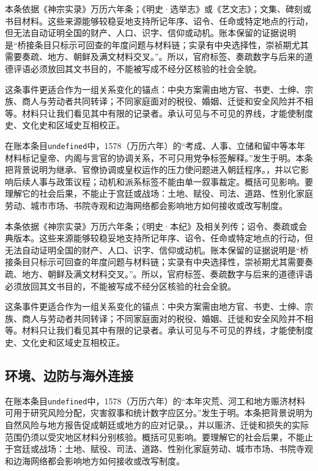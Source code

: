 本条依据《神宗实录》万历六年条；《明史·选举志》或《艺文志》；文集、碑刻或书目材料。这些来源能够较稳妥地支持所记年序、诏令、任命或特定地点的行动，但无法自动证明全国的财产、人口、识字、信仰或动机。账本保留的证据说明是“桥接条目只标示可回查的年度问题与材料链；实录有中央选择性，崇祯期尤其需要奏疏、地方、朝鲜及满文材料交叉。”。所以，官府标签、奏疏数字与后来的道德评语必须放回其文书目的，不能被写成不经分区核验的社会全貌。

这条事件更适合作为一组关系变化的锚点：中央方案需由地方官、书吏、士绅、宗族、商人与劳动者共同转译；不同家庭面对的税役、婚姻、迁徙和安全风险并不相等。材料只让我们看见其中有限的记录者。承认可见与不可见的界线，才能使制度史、文化史和区域史互相校正。

在账本条目\texttt{undefined}中，1578（万历六年）的“考成、人事、立储和留中等本年材料标记皇帝、内阁与言官的协调关系，不可只用党争标签解释。”发生于明。本条把背景说明为继承、官僚协调或皇权运作的压力使问题进入朝廷程序。，并以它影响后续人事与政策议程；动机和派系标签不能由单一叙事裁定。概括可见影响。要理解它的社会后果，不能止于宫廷或战场：土地、赋役、司法、道路、性别化家庭劳动、城市市场、书院寺观和边海网络都会影响地方如何接收或改写制度。

本条依据《神宗实录》万历六年条；《明史·本纪》及相关列传；诏令、奏疏或会典版本。这些来源能够较稳妥地支持所记年序、诏令、任命或特定地点的行动，但无法自动证明全国的财产、人口、识字、信仰或动机。账本保留的证据说明是“桥接条目只标示可回查的年度问题与材料链；实录有中央选择性，崇祯期尤其需要奏疏、地方、朝鲜及满文材料交叉。”。所以，官府标签、奏疏数字与后来的道德评语必须放回其文书目的，不能被写成不经分区核验的社会全貌。

这条事件更适合作为一组关系变化的锚点：中央方案需由地方官、书吏、士绅、宗族、商人与劳动者共同转译；不同家庭面对的税役、婚姻、迁徙和安全风险并不相等。材料只让我们看见其中有限的记录者。承认可见与不可见的界线，才能使制度史、文化史和区域史互相校正。

\subsection{环境、边防与海外连接}

在账本条目\texttt{undefined}中，1578（万历六年）的“本年灾荒、河工和地方赈济材料可用于研究风险分配，灾害叙事和统计数字应区分。”发生于明。本条把背景说明为自然风险与地方报告促成朝廷或地方的应对记录。，并以赈济、迁徙和损失的实际范围仍须以受灾地区材料分别核验。概括可见影响。要理解它的社会后果，不能止于宫廷或战场：土地、赋役、司法、道路、性别化家庭劳动、城市市场、书院寺观和边海网络都会影响地方如何接收或改写制度。

